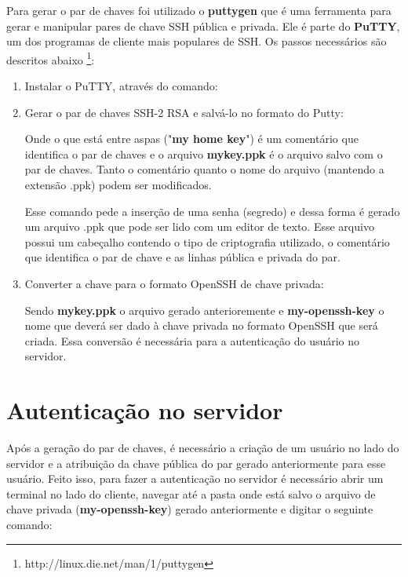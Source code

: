 \documentclass[11pt,a4paper]{report}
\begin{document}
Para gerar o par de chaves foi utilizado o \textbf{puttygen} que é uma ferramenta para gerar e manipular pares de chave SSH pública e privada. Ele é parte do \textbf{PuTTY}, um dos programas de cliente mais populares de SSH. Os passos necessários são descritos abaixo \footnote{http://linux.die.net/man/1/puttygen}:

\begin{enumerate}
\item Instalar o PuTTY, através do comando:


\item Gerar o par de chaves SSH-2 RSA e salvá-lo no formato do Putty:


Onde o que está entre aspas ("\textbf{my home key}") é um comentário que identifica o par de chaves e o arquivo \textbf{mykey.ppk} é o arquivo salvo com o par de chaves. Tanto o comentário quanto o nome do arquivo (mantendo a extensão .ppk) podem ser modificados. 

Esse comando pede a inserção de uma senha (segredo) e dessa forma é gerado um arquivo .ppk que pode ser lido com um editor de texto. Esse arquivo possui um cabeçalho contendo o tipo de criptografia utilizado, o comentário que identifica o par de chave e as linhas pública e privada do par.

\item Converter a chave para o formato OpenSSH de chave privada:


Sendo \textbf{mykey.ppk} o arquivo gerado anterioremente e \textbf{my-openssh-key} o nome que deverá ser dado à chave privada no formato OpenSSH que será criada. Essa conversão é necessária para a autenticação do usuário no servidor. 

\end{enumerate}

\section{Autenticação no servidor \label{autenticao}}

Após a geração do par de chaves, é necessário a criação de um usuário no lado do servidor e a atribuição da chave pública do par gerado anteriormente para esse usuário. Feito isso, para fazer a autenticação no servidor é necessário abrir um terminal no lado do cliente, navegar até a pasta onde está salvo o arquivo de chave privada (\textbf{my-openssh-key}) gerado anteriormente e digitar o seguinte comando: \\
\end{document}
